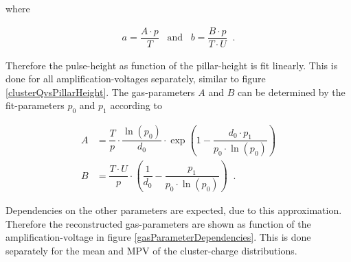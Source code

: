 \documentclass[
twoside,            %
BCOR1.4cm,          %
10pt,               %
headings=normal,    %
headsepline,        %
clearplainpage,		%
final,              %
div=14,
open=right,
bibliography=toc
]{scrreprt}
\begin{document}
where 

\begin{align}
	a = \dfrac{A \cdot p}{T} \;\;\; \text{and} \;\;\; b = \dfrac{B \cdot p}{T \cdot U} \;\; .
\end{align}

Therefore the pulse-height as function of the pillar-height is fit linearly. 
This is done for all amplification-voltages separately, similar to figure \ref{clusterQvsPillarHeight}.
The gas-parameters $A$ and $B$ can be determined by the fit-parameters $p_0$ and $p_1$ according to

\begin{align}
	A &= \dfrac{T}{p} \cdot \dfrac{\ln(p_0)}{d_0} \cdot \exp\left( 1 - \dfrac{d_0 \cdot p_1}{p_0 \cdot \ln(p_0)} \right)
	\\[10pt]
	B &= \dfrac{T \cdot U}{p} \cdot \left( \dfrac{1}{d_0} - \dfrac{p_1}{p_0 \cdot \ln( p_0 ) } \right) \;\; .
\end{align}

Dependencies on the other parameters are expected, due to this approximation.
Therefore the reconstructed gas-parameters are shown as function of the amplification-voltage in figure \ref{gasParameterDependencies}.
This is done separately for the mean and MPV of the cluster-charge distributions.
\end{document}
